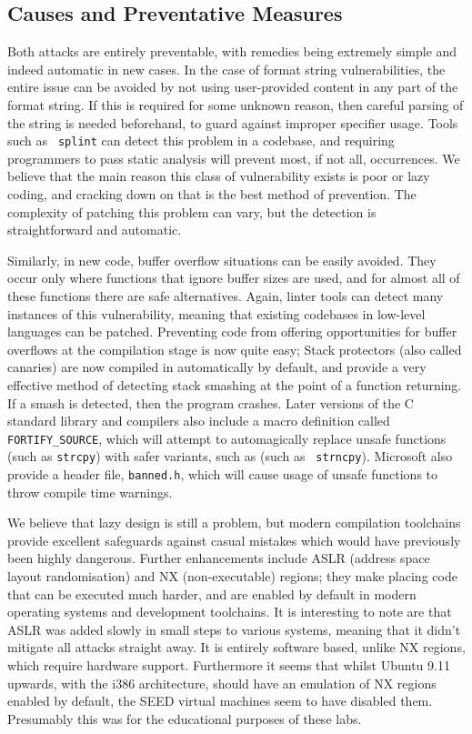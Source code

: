 \subsection{Causes and Preventative Measures} Both attacks are entirely preventable, with remedies being extremely
simple and indeed automatic in new cases. In the case of format string vulnerabilities, the entire issue can be avoided
by not using user-provided content in any part of the format string. If this is required for some unknown reason, then
careful parsing of the string  is needed beforehand, to guard against improper specifier usage. Tools such as {\tt
splint} can detect  this problem in a codebase\cite{splint_art}, and requiring programmers to pass static analysis will
prevent most, if not all, occurrences. We believe that the main reason this class of vulnerability exists is poor or lazy
coding, and cracking down on that is the best method of prevention. The complexity of patching this problem can vary,
but the detection is straightforward and automatic.

Similarly, in new code, buffer overflow situations can be easily avoided. They occur only where functions that ignore
buffer sizes are used, and for almost all of these functions there are safe alternatives. Again, linter tools can detect
many instances of this vulnerability, meaning that existing codebases in low-level languages can be patched. Preventing
code from offering opportunities for buffer overflows at the compilation stage is now quite easy;  Stack protectors
(also called canaries) are now compiled in automatically by default, and provide a very effective method of detecting
stack smashing at the point of a function returning. If a smash is detected, then the program crashes. Later versions of
the C standard library and compilers also include a macro definition called {\tt FORTIFY\_SOURCE}, which will attempt to
automagically replace unsafe functions (such as {\tt strcpy}) with safer variants, such as  (such as {\tt
strncpy})\cite{fort_source}. Microsoft also provide a header file, {\tt banned.h}, which will cause usage of unsafe
functions to throw compile time warnings\cite{banned}.

We believe that lazy design is still a problem, but modern compilation toolchains provide excellent safeguards against
casual mistakes which would have previously been highly dangerous. Further enhancements include ASLR (address space
layout randomisation) and NX (non-executable) regions; they make placing code that can be executed much harder, and are
enabled by default in modern operating systems and development toolchains\cite{wiki_aslr}\cite{wiki_nx}. It is
interesting to note are that ASLR was added slowly in small steps to various systems, meaning that it didn't mitigate
all attacks straight away. It is entirely software based, unlike NX regions, which require hardware support. Furthermore
it seems that whilst Ubuntu 9.11 upwards, with the i386 architecture, should have an emulation of NX regions enabled by
default\cite{nx_bit}, the SEED virtual machines seem to have disabled them.  Presumably this was for the educational
purposes of these labs.


